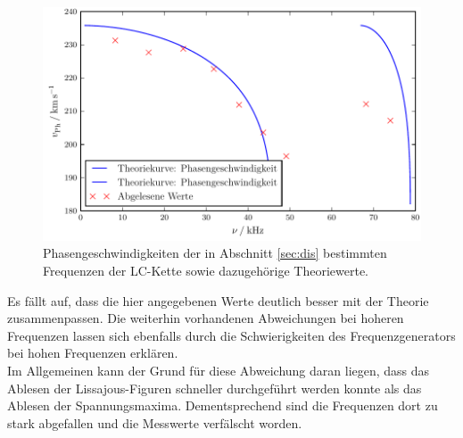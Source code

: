 \begin{figure}[H]
  \centering
  \includegraphics{neu.pdf}
  \caption{Phasengeschwindigkeiten der in Abschnitt \ref{sec:dis} bestimmten Frequenzen der LC-Kette sowie dazugehörige Theoriewerte.}
  \label{fig:neucool}
\end{figure}
Es fällt auf, dass die hier angegebenen Werte deutlich besser mit der Theorie zusammenpassen.
Die weiterhin vorhandenen Abweichungen bei hoheren Frequenzen lassen sich ebenfalls durch die Schwierigkeiten des Frequenzgenerators bei hohen Frequenzen erklären.\\
Im Allgemeinen kann der Grund für diese Abweichung daran liegen, dass das Ablesen der Lissajous-Figuren schneller durchgeführt werden konnte als das Ablesen der Spannungsmaxima.
Dementsprechend sind die Frequenzen dort zu stark abgefallen und die Messwerte verfälscht worden.


%
%
%
%
%
